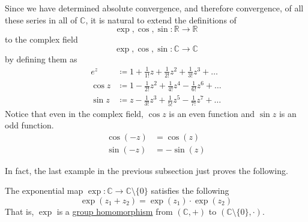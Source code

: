     \begin{definition}
      \label{def:complex-taylor-expansions-of-transcendental}
      Since we have determined absolute convergence, and therefore convergence, of all these series in all of $\mathbb{C}$, it is natural to extend the definitions of 
      \begin{equation}
        \exp, \cos, \sin: \mathbb{R} \to \mathbb{R}
      \end{equation}
      to the complex field 
      \begin{equation}
        \exp, \cos, \sin: \mathbb{C} \to \mathbb{C}
      \end{equation}
      by defining them as 
      \begin{align*}
          e^z & \coloneqq 1 + \frac{1}{1!}z + \frac{1}{2!} z^2 + \frac{1}{3!} z^3 + \ldots \\
          \cos{z} & \coloneqq 1 - \frac{1}{2!} z^2 + \frac{1}{4!} z^4 - \frac{1}{6!} z^6 + \ldots \\
          \sin{z} & \coloneqq z - \frac{1}{3!} z^3 + \frac{1}{5!} z^5 - \frac{1}{7!} z^7 + \ldots
      \end{align*}
      Notice that even in the complex field, $\cos{z}$ is an even function and $\sin{z}$ is an odd function. 
      \begin{align*}
          \cos(-z) & = \cos(z) \\
          \sin(-z) & = -\sin(z)
      \end{align*}
    \end{definition}

    In fact, the last example in the previous subsection just proves the following. 

    \begin{lemma}
      \label{thm:exponential-map-as-a-group-homomorphism}
      The exponential map $\exp: \mathbb{C} \to \mathbb{C}\setminus \{0\}$ satisfies the following
      \begin{equation}
        \exp(z_1 + z_2) = \exp(z_1) \cdot \exp (z_2)
      \end{equation}
      That is, $\exp$ is a \hyperref[alg-def:group-homomorphism]{group homomorphism} from $(\mathbb{C}, +)$ to $(\mathbb{C} \setminus \{0\}, \cdot)$. 
    \end{lemma}

